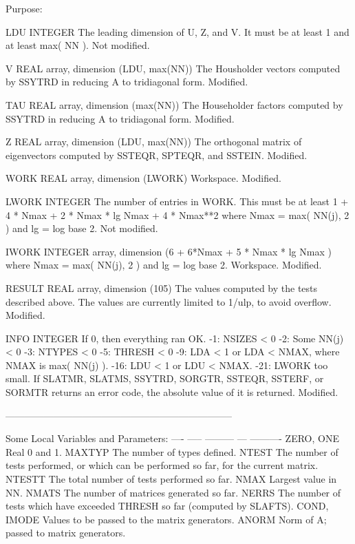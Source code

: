 \begin{DoxyParagraph}{Purpose\+: }
\begin{DoxyVerb}
  LDU     INTEGER
          The leading dimension of U, Z, and V.  It must be at
          least 1 and at least max( NN ).
          Not modified.

  V       REAL array, dimension (LDU, max(NN))
          The Housholder vectors computed by SSYTRD in reducing A to
          tridiagonal form.
          Modified.

  TAU     REAL array, dimension (max(NN))
          The Householder factors computed by SSYTRD in reducing A
          to tridiagonal form.
          Modified.

  Z       REAL array, dimension (LDU, max(NN))
          The orthogonal matrix of eigenvectors computed by SSTEQR,
          SPTEQR, and SSTEIN.
          Modified.

  WORK    REAL array, dimension (LWORK)
          Workspace.
          Modified.

  LWORK   INTEGER
          The number of entries in WORK.  This must be at least
          1 + 4 * Nmax + 2 * Nmax * lg Nmax + 4 * Nmax**2
          where Nmax = max( NN(j), 2 ) and lg = log base 2.
          Not modified.

  IWORK   INTEGER array,
             dimension (6 + 6*Nmax + 5 * Nmax * lg Nmax )
          where Nmax = max( NN(j), 2 ) and lg = log base 2.
          Workspace.
          Modified.

  RESULT  REAL array, dimension (105)
          The values computed by the tests described above.
          The values are currently limited to 1/ulp, to avoid
          overflow.
          Modified.

  INFO    INTEGER
          If 0, then everything ran OK.
           -1: NSIZES < 0
           -2: Some NN(j) < 0
           -3: NTYPES < 0
           -5: THRESH < 0
           -9: LDA < 1 or LDA < NMAX, where NMAX is max( NN(j) ).
          -16: LDU < 1 or LDU < NMAX.
          -21: LWORK too small.
          If  SLATMR, SLATMS, SSYTRD, SORGTR, SSTEQR, SSTERF,
              or SORMTR returns an error code, the
              absolute value of it is returned.
          Modified.

-----------------------------------------------------------------------

       Some Local Variables and Parameters:
       ---- ----- --------- --- ----------
       ZERO, ONE       Real 0 and 1.
       MAXTYP          The number of types defined.
       NTEST           The number of tests performed, or which can
                       be performed so far, for the current matrix.
       NTESTT          The total number of tests performed so far.
       NMAX            Largest value in NN.
       NMATS           The number of matrices generated so far.
       NERRS           The number of tests which have exceeded THRESH
                       so far (computed by SLAFTS).
       COND, IMODE     Values to be passed to the matrix generators.
       ANORM           Norm of A; passed to matrix generators.


\end{DoxyVerb}
\end{DoxyParagraph}

